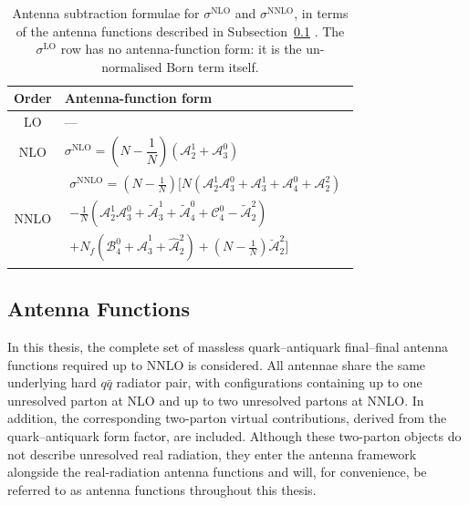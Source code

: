 \begin{table}[h]
    \centering
    \footnotesize
    \renewcommand{\arraystretch}{1.8}
    \begin{tabular}{|c|p{11cm}|}
        \hline
        \textbf{Order} & \textbf{Antenna-function form} \\
        \hline
        LO & --- \\
        \hline
        NLO & $\sigma^\text{NLO} = \left(N-\dfrac1N\right)\left(\mathcal A_2^1+\mathcal A_3^0\right)$ \\
        \hline
        NNLO &
        $\begin{gathered}
            \sigma^\text{NNLO} = \left(N-\tfrac1N\right)\Bigg[N\left(\mathcal A_2^1\mathcal A_3^0+\mathcal A_3^1+\mathcal A_4^0+\mathcal A_2^2\right)\\
            -\tfrac1N\left(\mathcal A_2^1\mathcal A_3^0 + \tilde{\mathcal A}_3^1+\tilde{\mathcal A}_4^0+\mathcal C_4^0-\tilde{\mathcal A}_2^2\right)\\
            +N_f\left(\mathcal B_4^0+\hat{\mathcal A}_3^1+\hat{\mathcal A}_2^2\right)+\left(N-\tfrac1N\right)\breve{\mathcal A}_2^2\Bigg]
        \end{gathered}$ \\
        \hline
    \end{tabular}
    \caption{Antenna subtraction formulae for $\sigma^\text{NLO}$ and $\sigma^\text{NNLO}$, in terms of the antenna functions described in Subsection~\ref{subsec:antennaFuncs} \cite{Gehrmann-DeRidder:2005btv}. The $\sigma^\text{LO}$ row has no antenna-function form: it is the un-normalised Born term itself.}
    \label{tab:sigmaByOrder}
\end{table}

\fi

\subsection{Antenna Functions}\label{subsec:antennaFuncs}

In this thesis, the complete set of massless quark--antiquark final--final
antenna functions required up to NNLO is considered. All antennae share the
same underlying hard $q\bar q$ radiator pair, with configurations containing
up to one unresolved parton at NLO and up to two unresolved partons at NNLO. In
addition, the corresponding two-parton virtual contributions, derived from the
quark--antiquark form factor, are included. Although these two-parton objects
do not describe unresolved real radiation, they enter the antenna framework
alongside the real-radiation antenna functions and will, for convenience, be
referred to as antenna functions throughout this thesis.

